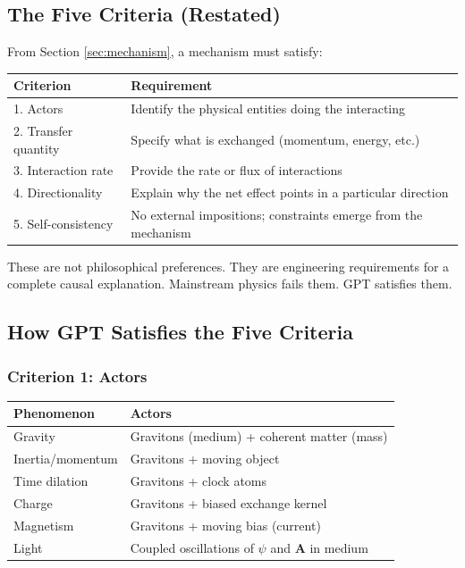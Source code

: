 \documentclass[12pt, a4paper]{article}
\begin{document}
\subsection{The Five Criteria (Restated)}
\label{subsec:criteria_restated}

From Section \ref{sec:mechanism}, a mechanism must satisfy:

\begin{center}
\begin{tabular}{|p{3cm}|p{10cm}|}
\hline
\textbf{Criterion} & \textbf{Requirement} \\
\hline
1. Actors & Identify the physical entities doing the interacting \\
\hline
2. Transfer quantity & Specify what is exchanged (momentum, energy, etc.) \\
\hline
3. Interaction rate & Provide the rate or flux of interactions \\
\hline
4. Directionality & Explain why the net effect points in a particular direction \\
\hline
5. Self-consistency & No external impositions; constraints emerge from the mechanism \\
\hline
\end{tabular}
\end{center}

These are not philosophical preferences. They are engineering requirements for a complete causal explanation. Mainstream physics fails them. GPT satisfies them.

\subsection{How GPT Satisfies the Five Criteria}
\label{subsec:gpt_satisfies}

\subsubsection{Criterion 1: Actors}

\begin{center}
\begin{tabular}{|p{3.5cm}|p{10cm}|}
\hline
\textbf{Phenomenon} & \textbf{Actors} \\
\hline
Gravity & Gravitons (medium) + coherent matter (mass) \\
\hline
Inertia/momentum & Gravitons + moving object \\
\hline
Time dilation & Gravitons + clock atoms \\
\hline
Charge & Gravitons + biased exchange kernel \\
\hline
Magnetism & Gravitons + moving bias (current) \\
\hline
Light & Coupled oscillations of \( \psi \) and \( \mathbf{A} \) in medium \\
\hline
\end{tabular}
\end{center}
\end{document}
